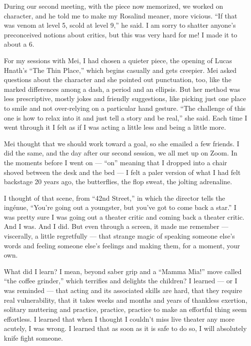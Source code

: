 During our second meeting, with the piece now memorized, we worked on
character, and he told me to make my Rosalind meaner, more vicious. ``If
that was venom at level 5, scold at level 9,'' he said. I am sorry to
shatter anyone's preconceived notions about critics, but this was very
hard for me! I made it to about a 6.

For my sessions with Mei, I had chosen a quieter piece, the opening of
Lucas Hnath's ``The Thin Place,'' which begins casually and gets
creepier. Mei asked questions about the character and she pointed out
punctuation, too, like the marked differences among a dash, a period and
an ellipsis. But her method was less prescriptive, mostly jokes and
friendly suggestions, like picking just one place to smile and not
over-relying on a particular hand gesture. ``The challenge of this one
is how to relax into it and just tell a story and be real,'' she said.
Each time I went through it I felt as if I was acting a little less and
being a little more.

Mei thought that we should work toward a goal, so she emailed a few
friends. I did the same, and the day after our second session, we all
met up on Zoom. In the moments before I went on --- ``on'' meaning that
I dropped into a chair shoved between the desk and the bed --- I felt a
paler version of what I had felt backstage 20 years ago, the
butterflies, the flop sweat, the jolting adrenaline.

I thought of that scene, from ``42nd Street,'' in which the director
tells the ingénue, ``You're going out a youngster, but you've got to
come back a star.'' I was pretty sure I was going out a theater critic
and coming back a theater critic. And I was. And I did. But even through
a screen, it made me remember --- viscerally, a little regretfully ---
that strange magic of speaking someone else's words and feeling someone
else's feelings and making them, for a moment, your own.

What did I learn? I mean, beyond saber grip and a ``Mamma Mia!'' move
called ``the coffee grinder,'' which terrifies and delights the
children? I learned --- or I was reminded --- that acting and its
associated skills are hard, that they require real vulnerability, that
it takes weeks and months and years of thankless exertion, solitary
muttering and practice, practice, practice to make an effortful thing
seem effortless. I learned that when I thought I couldn't miss live
theater any more acutely, I was wrong. I learned that as soon as it is
safe to do so, I will absolutely knife fight someone.

